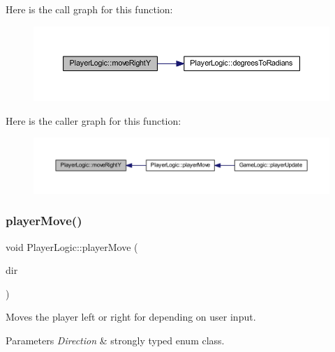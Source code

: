 Here is the call graph for this function\+:
\nopagebreak
\begin{figure}[H]
\begin{center}
\leavevmode
\includegraphics[width=350pt]{class_player_logic_a4b77bba06ba630f974aaa85306109485_cgraph}
\end{center}
\end{figure}
Here is the caller graph for this function\+:
\nopagebreak
\begin{figure}[H]
\begin{center}
\leavevmode
\includegraphics[width=350pt]{class_player_logic_a4b77bba06ba630f974aaa85306109485_icgraph}
\end{center}
\end{figure}
\mbox{\label{class_player_logic_a2b63d2c01e898e5798c2801466c8b432}} 
\subsubsection{\texorpdfstring{player\+Move()}{playerMove()}}
{\footnotesize\ttfamily void Player\+Logic\+::player\+Move (\begin{DoxyParamCaption}\item[{\hyperlink{_game_common_data_8h_a224b9163917ac32fc95a60d8c1eec3aa}{Direction}}]{dir }\end{DoxyParamCaption})\hspace{0.3cm}{\ttfamily [virtual]}}



Moves the player left or right for depending on user input. 


\begin{DoxyParams}{Parameters}
{\em Direction} & strongly typed enum class. \\
\hline
\end{DoxyParams}



